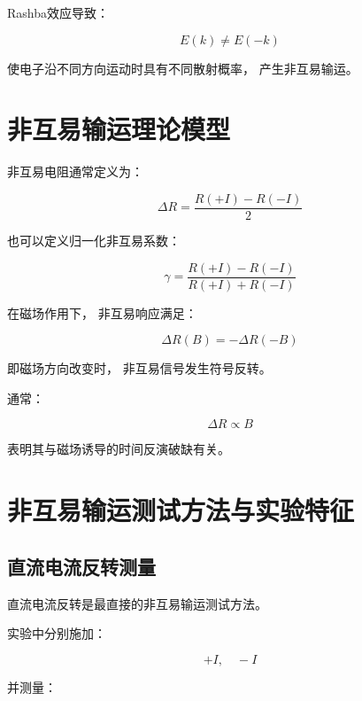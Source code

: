 \documentclass[10.5pt]{article}
\begin{document}
Rashba效应导致：

\begin{equation}
E(k)\neq E(-k)
\end{equation}


使电子沿不同方向运动时具有不同散射概率，
产生非互易输运。



\section{非互易输运理论模型}


非互易电阻通常定义为：

\begin{equation}
\Delta R=
\frac{R(+I)-R(-I)}{2}
\end{equation}


也可以定义归一化非互易系数：

\begin{equation}
\gamma=
\frac{R(+I)-R(-I)}
{R(+I)+R(-I)}
\end{equation}


在磁场作用下，
非互易响应满足：

\begin{equation}
\Delta R(B)
=
-\Delta R(-B)
\end{equation}


即磁场方向改变时，
非互易信号发生符号反转。


通常：

\begin{equation}
\Delta R\propto B
\end{equation}

表明其与磁场诱导的时间反演破缺有关。



\section{非互易输运测试方法与实验特征}


\subsection{直流电流反转测量}


直流电流反转是最直接的非互易输运测试方法。


实验中分别施加：

\begin{equation}
+I,\quad -I
\end{equation}


并测量：
\end{document}
